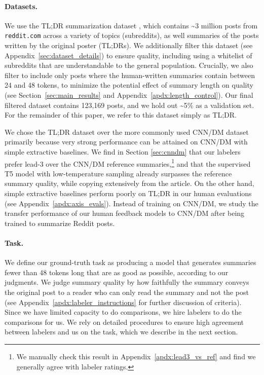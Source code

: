 \paragraph{Datasets.} We use the TL;DR summarization dataset \cite{volske2017tl}, which contains \textasciitilde 3 million posts from \texttt{reddit.com} across a variety of topics (subreddits), as well summaries of the posts written by the original poster (TL;DRs). We additionally filter this dataset (see Appendix~\ref{sec:dataset_details}) to ensure quality, including using a whitelist of subreddits that are understandable to the general population.  Crucially, we also filter to include only posts where the human-written summaries contain between 24 and 48 tokens, to minimize the potential effect of summary length on quality (see Section~\ref{sec:main_results} and Appendix~\ref{apdx:length_control}). 
Our final filtered dataset contains 123,169 posts, and we hold out \textasciitilde 5\% as a validation set.  For the remainder of this paper, we refer to this dataset simply as TL;DR.

We chose the TL;DR dataset over the more commonly used CNN/DM dataset primarily because very strong performance can be attained on CNN/DM with simple extractive baselines. We find in Section \ref{sec:cnndm} that our labelers prefer lead-3 over the CNN/DM reference summaries,\footnote{We manually check this result in Appendix~\ref{apdx:lead3_vs_ref} and find we generally agree with labeler ratings.} and that the supervised T5 model \cite{raffel2019exploring} with low-temperature sampling already surpasses the reference summary quality, while copying extensively from the article. On the other hand, simple extractive baselines perform poorly on TL;DR in our human evaluations (see Appendix~\ref{apdx:axis_evals}).
Instead of training on CNN/DM, we study the transfer performance of our human feedback models to CNN/DM after being trained to summarize Reddit posts. 

\paragraph{Task.} We define our ground-truth task as producing a model that generates summaries fewer than 48 tokens long that are as good as possible, according to our judgments. We judge summary quality by how faithfully the summary conveys the original post to a reader who can only read the summary and not the post (see Appendix~\ref{apdx:labeler_instructions} for further discussion of criteria). Since we have limited capacity to do comparisons, we hire labelers to do the comparisons for us. We rely on detailed procedures to ensure high agreement between labelers and us on the task, which we describe in the next section. 

